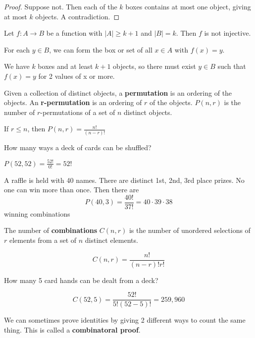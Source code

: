 \documentclass{article}
\begin{document}
    \begin{proof}
      Suppose not. Then each of the $k$ boxes contains at most one object, giving at most $k$ objects. A contradiction.
    \end{proof}
    \begin{example}
      Let $f: A \to B$ be a function with $|A| \geq k+1$ and $|B| = k$. Then $f$ is not injective.

      For each $y \in B$, we can form the box or set of all $x \in A$ with $f(x) = y$.

      We have $k$ boxes and at least $k+1$ objects, so there must exist $y \in B$ such that $f(x) = y$ for 2 values of x or more.
    \end{example}
    \begin{definition}
      Given a collection of distinct objects, a \textbf{permutation} is an ordering of the objects. An \textbf{r-permutation} is an ordering of $r$ of the objects. $P(n, r)$ is the number of $r$-permutations of a set of $n$ distinct objects.

      If $r \leq n$, then $P(n, r) = \frac{n!}{(n-r)!}$

    \end{definition}
    \begin{example}
      How many ways a deck of cards can be shuffled?

      $P(52, 52) = \frac{52!}{0!} = 52!$
    \end{example}
    \begin{example}
      A raffle is held with 40 names. There are distinct 1st, 2nd, 3rd place prizes. No one can win more than once. Then there are
      \[
        P(40, 3) = \frac{40!}{37!} = 40 \cdot 39 \cdot 38
      \]
      winning combinations
    \end{example}
    \begin{definition}
      The number of \textbf{combinations} $C (n, r )$ is the number of unordered selections of $r$ elements from a set of $n$ distinct elements.

      \[
        C(n, r) = \frac{n!}{(n-r)!r!}
      \]
    \end{definition}
    \begin{example}
      How many 5 card hands can be dealt from a deck?

      \[
        C(52, 5) = \frac{52!}{5!(52-5)!} = 259,960
      \]
    \end{example}
    \begin{definition}
      We can sometimes prove identities by giving 2 different ways to count the same thing. This is called a \textbf{combinatoral proof}.
    \end{definition}
\end{document}
